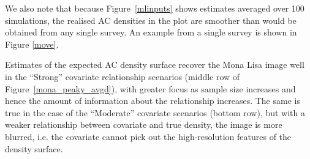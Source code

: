 \documentclass[10pt,a4paper]{article}
\begin{document}
We also note that because Figure~\ref{mlinputs} shows estimates averaged over 100 simulations, the realised AC densities in the plot are smoother than would be obtained from any single survey. An example from a single survey is shown in Figure \ref{move}.



Estimates of the expected AC density surface recover the Mona Lisa image well in the ``Strong'' covariate relationship scenarios (middle row of Figure~\ref{mona_peaky_avgd}), with greater focus as sample size increases and hence the amount of information about the relationship increases. The same is true in the case of the ``Moderate'' covariate scenarios (bottom row), but with a weaker relationship between covariate and true density, the image is more blurred, i.e. the covariate cannot pick out the high-resolution features of the density surface.
\end{document}
